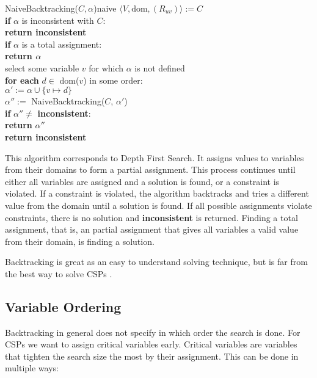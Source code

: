 \begin{function}{NaiveBacktracking($C, \alpha$)}{naive}
	$\langle V, \text{dom}, (R_{uv})\rangle := C$ \\
	\textbf{if} $\alpha$ is inconsistent with $C$: \\
	\null \qquad \textbf{return inconsistent} \\

	\textbf{if} $\alpha$ is a total assignment: \\
	\null \qquad \textbf{return $\alpha$} \\

	select some variable $v$ for which $\alpha$ is not defined \\
	\textbf{for each} $d \in$ dom($v$) in some order: \\
	\null \qquad  $\alpha' := \alpha \cup \{v \mapsto d\}$ \\
	\null \qquad  $\alpha'' := $ NaiveBacktracking($C$, $\alpha'$) \\
	\null \qquad  \textbf{if} $\alpha'' \neq$ \textbf{inconsistent}: \\
	\null \qquad \qquad  \textbf{return} $\alpha''$ \\

	\textbf{return inconsistent}
\end{function}

This algorithm corresponds to Depth First Search. It assigns values to variables from their domains to form a partial assignment. This process continues until either all variables are assigned and a solution is found, or a constraint is violated. If a constraint is violated, the algorithm backtracks and tries a different value from the domain until a solution is found. If all possible assignments violate constraints, there is no solution and \textbf{inconsistent} is returned. Finding a total assignment, that is, an partial assignment that gives all variables a valid value from their domain, is finding a solution.

Backtracking is great as an easy to understand solving technique, but is far from the best way to solve CSPs \cite{forward_checking:1995}.

\subsection{Variable Ordering}

Backtracking in general does not specify in which order the search is done. For CSPs we want to assign critical variables early. Critical variables are variables that tighten the search size the most by their assignment. This can be done in multiple ways:

